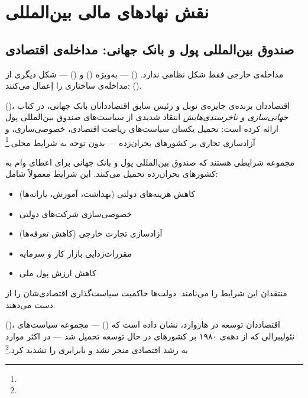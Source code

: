 \section{نقش نهادهای مالی بین‌المللی}
\label{sec:ch12-ifis}

\subsection{صندوق بین‌المللی پول و بانک جهانی: مداخله‌ی اقتصادی}
\label{subsec:ch12-imf-wb}

مداخله‌ی خارجی فقط شکل نظامی ندارد.  () — به‌ویژه  () و  () — شکل دیگری از مداخله‌ی ساختاری را اِعمال می‌کنند:  ().

 ()، اقتصاددان برنده‌ی جایزه‌ی نوبل و رئیس سابق اقتصاددانان بانک جهانی، در کتاب \textit{جهانی‌سازی و ناخرسندی‌هایش} انتقاد شدیدی از سیاست‌های صندوق بین‌المللی پول ارائه کرده است: تحمیل یکسان سیاست‌های ریاضت اقتصادی، خصوصی‌سازی، و آزادسازی تجاری بر کشورهای بحران‌زده — بدون توجه به شرایط محلی.\footnote{}

\begin{tcolorbox}[defbox, title={تعریف: تعدیل ساختاری به‌مثابه‌ی مداخله}]
 مجموعه شرایطی هستند که صندوق بین‌المللی پول و بانک جهانی برای اعطای وام به کشورهای بحران‌زده تحمیل می‌کنند. این شرایط معمولاً شامل:
\begin{itemize}
\item کاهش هزینه‌های دولتی (بهداشت، آموزش، یارانه‌ها)
\item خصوصی‌سازی شرکت‌های دولتی
\item آزادسازی تجارت خارجی (کاهش تعرفه‌ها)
\item مقررات‌زدایی بازار کار و سرمایه
\item کاهش ارزش پول ملی
\end{itemize}
منتقدان این شرایط را  می‌نامند: دولت‌ها حاکمیت سیاست‌گذاری اقتصادی‌شان را از دست می‌دهند.
\end{tcolorbox}

 ()، اقتصاددان توسعه در هاروارد، نشان داده است که  () — مجموعه سیاست‌های نئولیبرالی که از دهه‌ی ۱۹۸۰ بر کشورهای در حال توسعه تحمیل شد — در اکثر موارد به رشد اقتصادی منجر نشد و نابرابری را تشدید کرد.\footnote{}

